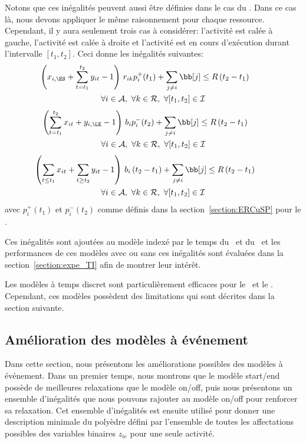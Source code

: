 Notons que ces inégalités peuvent aussi être définies dans le cas du
\RCPSP. Dans ce cas là, nous devons appliquer le même raisonnement
pour chaque ressource. Cependant, il y aura seulement trois cas à
considérer: l'activité est calée à gauche, l'activité est calée à
droite et l'activité est en cours d'exécution durant l'intervalle
$[t_1,t_2]$. Ceci donne les inégalités suivantes:
\begin{multline} \left(x_{i,\ES} + \sum_{t=t_1}^{t_2}y_{it} -1\right)
\, r_{ik}p_i^+(t_1)+ \sum_{j\neq i} \bb[j] \le R\left(t_2-t_1\right)
\qquad \\ \forall i \in {\cal A},\ \forall k \in \R ,\ \forall
[t_1,t_2] \in \I
    \label{RCPSP_left}
\end{multline} \vspace{-1.3cm}
\begin{multline} \left(\sum_{t=t_1}^{t_2}x_{it} + y_{i,\LE}-1\right)
\, b_ip_i^-(t_2) + \sum_{j\neq i} \bb[j] \le R\left(t_2-t_1\right)
\qquad \\ \forall i \in {\cal A},\ \forall k \in \R ,\ \forall
[t_1,t_2] \in \I
    \label{RCPSP_right}
\end{multline} \vspace{-1.3cm}
\begin{multline} \left(\sum_{t\le t_1}x_{it} + \sum_{t\ge t_2}y_{it}
-1 \right) \, b_i\left(t_2-t_1\right) + \sum_{j\neq i} \bb[j] \le
R\left(t_2-t_1\right) \qquad \\ \forall i \in {\cal A},\ \forall k \in
\R ,\ \forall [t_1,t_2] \in \I
    \label{RCPSP_min}
\end{multline}
avec $p_i^+(t_1)$ et $p_i^-(t_2)$ comme définis dans la
section~\ref{section:ERCuSP} pour le \CUSP.

Ces inégalités sont ajoutées au modèle indexé par le temps du
\CECSP~et du \RCPSP~et les performances de ces modèles avec ou sans
ces inégalités sont évaluées dans la section~\ref{section:expe_TI} afin
de montrer leur intérêt.
 
Les modèles à temps discret sont particulièrement efficaces pour le
\RCPSP~et le \CECSP. Cependant, ces modèles possèdent des limitations
qui sont décrites dans la section suivante. 



\subsection{Amélioration des modèles à événement}

Dans cette section, nous présentons les améliorations possibles des
modèles à événement. Dans un premier temps, nous montrons que le
modèle start/end possède de meilleures relaxations que le modèle
on/off, puis nous présentons un ensemble d'inégalités que nous pouvons
rajouter au modèle on/off pour renforcer sa relaxation. Cet ensemble
d'inégalités est ensuite utilisé pour donner une description minimale
du polyèdre défini par l'ensemble de toutes les affectations possibles
des variables binaires $z_{ie}$ pour une seule activité. 

